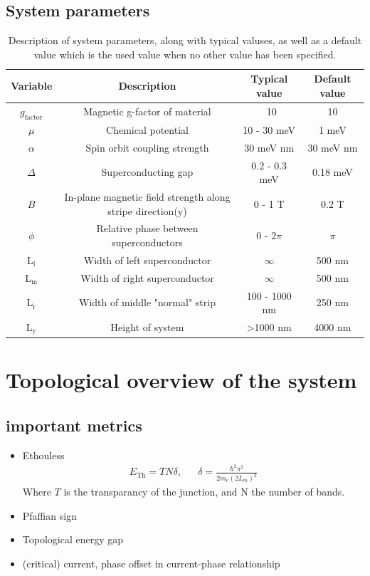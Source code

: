 \documentclass[10pt,a4paper]{article}
\begin{document}
	\subsection{System parameters}
	\begin{table}
		\begin{tabular}{|c|c|c|c|}
			\hline 
			Variable & Description & Typical value & Default value \\ 
			\hline 
			$g_\text{factor}$ & Magnetic g-factor of material & ~10 & 10 \\ 
			\hline 
			$\mu$ & Chemical potential &  10 - 30 meV & 1 meV\\ 
			\hline 
			$\alpha$ & Spin orbit coupling strength &  30 meV nm & 30 meV nm \\ 
			\hline 
			$\Delta$ & Superconducting gap & 0.2 - 0.3 meV & 0.18 meV\\ 
			\hline 
			$B$ & In-plane magnetic field strength along stripe direction(y) & 0 - 1 T & 0.2 T \\ 
			\hline 
			$\phi$ & Relative phase between superconductors &  0 - 2$\pi$ & $\pi$\\ 
			\hline 
			$\text{L}_\text{l}$ & Width of left superconductor & $\infty$ & 500 nm \\
			\hline 
			$\text{L}_\text{m}$ & Width of right superconductor & $\infty$ & 500 nm \\
			\hline
			$\text{L}_\text{r}$ & Width of middle "normal" strip & 100 - 1000 nm & 250 nm \\
			\hline
			$\text{L}_\text{y}$ & Height of system & \textgreater1000 nm & 4000 nm\\
			\hline
		\end{tabular} 
	\caption{Description of system parameters, along with typical valuses, as well as a default value which is the used value when no other value has been specified.}
	\label{tbl:system_pars}
	\end{table}
\section{Topological overview of the system}
	\subsection{important metrics}
		\begin{itemize}
			\item \Gls{Ethouless}
				\begin{align}\label{eq:thouless}
				E_\text{Th} = TN\delta
				, && \delta = \frac{\hbar^2 \pi^2}
				{2 m_e \left( 2 L_m \right)^2}
				\end{align}
			Where $T$ is the transparancy of the junction, and N the number of bands.
			\item Pfaffian sign
			\item Topological energy gap
			\item (critical) current, phase offset in current-phase relationship
		\end{itemize}
\end{document}
